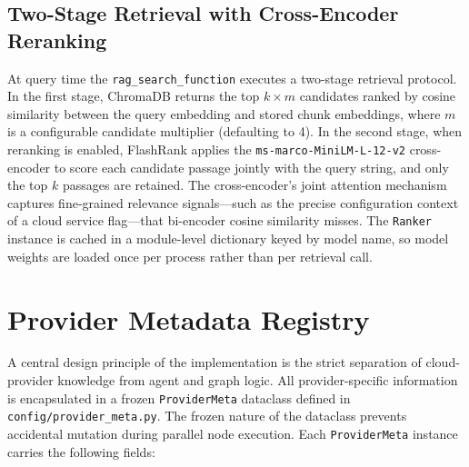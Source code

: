 \subsection{Two-Stage Retrieval with Cross-Encoder Reranking}

At query time the \texttt{rag\_search\_function} executes a two-stage retrieval protocol. In the first stage, ChromaDB returns the top $k \times m$ candidates ranked by cosine similarity between the query embedding and stored chunk embeddings, where $m$ is a configurable candidate multiplier (defaulting to 4). In the second stage, when reranking is enabled, FlashRank applies the \texttt{ms-marco-MiniLM-L-12-v2} cross-encoder to score each candidate passage jointly with the query string, and only the top $k$ passages are retained. The cross-encoder's joint attention mechanism captures fine-grained relevance signals---such as the precise configuration context of a cloud service flag---that bi-encoder cosine similarity misses. The \texttt{Ranker} instance is cached in a module-level dictionary keyed by model name, so model weights are loaded once per process rather than per retrieval call.

\section{Provider Metadata Registry}

A central design principle of the implementation is the strict separation of cloud-provider knowledge from agent and graph logic. All provider-specific information is encapsulated in a frozen \texttt{ProviderMeta} dataclass defined in \texttt{config/provider\_meta.py}. The frozen nature of the dataclass prevents accidental mutation during parallel node execution. Each \texttt{ProviderMeta} instance carries the following fields:

